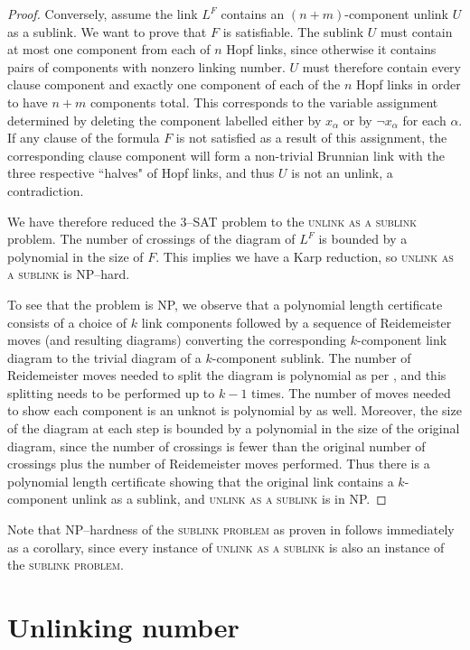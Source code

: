 \documentclass[12pt]{amsart}
\theoremstyle{definition}
\theoremstyle{remark}
\begin{document}
\begin{proof}
Conversely, assume the link $L^F$ contains an $(n+m)$-component unlink $U$ as a sublink.
We want to prove that $F$ is satisfiable.
The sublink $U$ must contain at most one component from each of $n$ Hopf links, since otherwise it contains pairs of components with nonzero linking number.
$U$ must therefore contain every clause component and exactly one component of each of the $n$ Hopf links in order to have $n+m$ components total.
This corresponds to the variable assignment determined by deleting the component labelled either by $x_\alpha$ or  by $\neg x_\alpha$ for each $\alpha$.
If any clause of the formula $F$ is not satisfied as a result of this assignment, the corresponding clause component will form a non-trivial Brunnian link with the three respective ``halves" of Hopf links, and thus $U$ is not an unlink, a contradiction.


We have therefore reduced the 3--\textsc{SAT} problem to the \textsc{unlink as a sublink} problem.
The number of crossings of the diagram of $L^F$ is bounded by a polynomial in the size of $F$.
This implies we have a Karp reduction, so \textsc{unlink as a sublink} is NP--hard.

To see that the problem is NP, we observe that a polynomial length certificate consists of a choice of $k$ link components followed by a sequence of Reidemeister moves (and resulting diagrams) converting the corresponding $k$-component link diagram to the trivial diagram of a $k$-component sublink.
The number of Reidemeister moves needed to split the diagram is polynomial as per \cite{HassLagariasPippenger1, Lackenby2}, and this splitting needs to be performed up to $k-1$ times.
The number of moves needed to show each component is an unknot is polynomial by \cite{HassLagariasPippenger1, Lackenby2} as well.
Moreover, the size of the diagram at each step is bounded by a polynomial in the size of the original diagram, since the number of crossings is fewer than the original number of crossings plus the number of Reidemeister moves performed.
Thus there is a polynomial length certificate showing that the original link contains a $k$-component unlink as a sublink, and \textsc{unlink as a sublink} is in NP.
\end{proof}
Note that NP--hardness of the \textsc{sublink problem} as proven in \cite{Lackenby1} follows immediately as a corollary, since every instance of \textsc{unlink as a sublink} is also an instance of the \textsc{sublink problem}.

\vspace*{1.5cm}
\section{Unlinking number}\label{sec_unlinkingnum}
\end{document}
